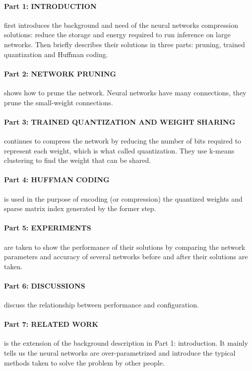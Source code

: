 \documentclass{article}
\begin{document}
\paragraph{Part 1: INTRODUCTION} first introduces the background and need of the 
neural networks compression solutions: reduce the storage and energy required 
to run inference on large networks. Then briefly describes their solutions in three
parts: pruning, trained quantization and Huffman coding.

\paragraph{Part 2: NETWORK PRUNING} shows how to prune the network. Neural networks 
have many connections, they prune the small-weight connections.

\paragraph{Part 3: TRAINED QUANTIZATION AND WEIGHT SHARING} continues to compress 
the network by reducing the number of bits required to represent each weight, which 
is what called quantization. They use k-means clustering to find the weight that 
can be shared. 

\paragraph{Part 4: HUFFMAN CODING} is used in the purpose of encoding (or compression) 
the quantized weights and sparse matrix index generated by the former step.

\paragraph{Part 5: EXPERIMENTS} are taken to show the performance of their solutions by 
comparing the network parameters and accuracy of several networks before and after 
their solutions are taken.

\paragraph{Part 6: DISCUSSIONS} discuss the relationship between performance and 
configuration.

\paragraph{Part 7: RELATED WORK} is the extension of the background description in 
Part 1: introduction. It mainly tells us the neural networks are over-parametrized 
and introduce the typical methods taken to solve the problem by other people. 
\end{document}
